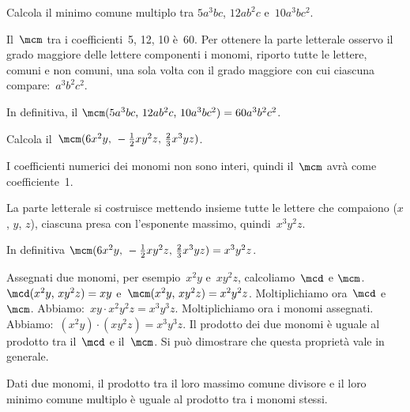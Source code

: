 \begin{exrig}
 \begin{esempio}
Calcola il minimo comune multiplo tra
$5a^{3}bc$, $12ab^{2}c$ e~$10a^{3}bc^{2}$.

Il~$\mcm$ tra i coefficienti~5, 12, 10 è~60. Per ottenere la parte
letterale osservo il grado maggiore delle lettere componenti i
monomi, riporto tutte le lettere, comuni e non comuni, una sola volta
con il grado maggiore con cui ciascuna compare:~$a^{3}b^{2}c^{2}$.

In definitiva, il
$\mcm(5a^{3}bc\text{,~}12ab^{2}c\text{,~}10a^{3}bc^{2})=60a^{3}b^{2}c^{2}$.
 \end{esempio}

 \begin{esempio}
Calcola il~$\mcm(6x^{2}y\text{,~}-\frac{1}{2}xy^{2}z\text{,~}\frac{2}{3}x^{3}yz)$.

I coefficienti numerici dei monomi non sono interi, quindi il~$\mcm$
avrà come coefficiente~1.

La parte letterale si costruisce mettendo insieme tutte le lettere che
compaiono ($x$, $y$, $z$), ciascuna presa con
l'esponente massimo, quindi~$x^{3}y^{2}z$.

In definitiva
$\mcm(6x^{2}y\text{,~}-\frac{1}{2}xy^{2}z\text{,~}\frac{2}{3}x^{3}yz)=x^{3}y^{2}z$.
 \end{esempio}
\end{exrig}

Assegnati due monomi, per esempio~$x^{2}y$ e~$xy^{2}z$,
calcoliamo~$\mcd$ e $\mcm$.
$\mcd(x^{2}y\text{,~}xy^{2}z)=xy$ e~$\mcm(x^{2}y\text{,~}xy^{2}z)=x^{2}y^{2}z$.
Moltiplichiamo ora~$\mcd$ e~$\mcm$. Abbiamo:~$xy\cdot x^{2}y^{2}z= x^{3}y^{3}z.$
Moltiplichiamo ora i monomi assegnati. Abbiamo:~$(x^{2}y)\cdot (xy^{2}z)=x^{3}y^{3}z.$
Il prodotto dei due monomi è uguale al prodotto tra il~$\mcd$ e
il~$\mcm$. Si può dimostrare che questa proprietà vale in generale.

\begin{proprieta}
 Dati due monomi, il prodotto tra il loro massimo comune
divisore e il loro minimo comune multiplo è uguale al prodotto tra i
monomi stessi.
\end{proprieta}

\ovalbox{\risolvii \ref{ese:9.41}, \ref{ese:9.42}, \ref{ese:9.43}, \ref{ese:9.44}, \ref{ese:9.45}, \ref{ese:9.46}, \ref{ese:9.47}}

\newpage

\cleardoublepage
